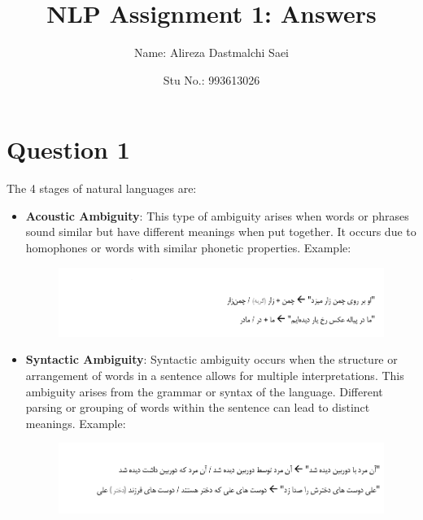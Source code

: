 \documentclass{article}
\title{\textbf{\Huge NLP Assignment 1: Answers}}
\author{Name: Alireza Dastmalchi Saei}
\date{Stu No.: 993613026}
\begin{document}
\maketitle

\pagebreak

\section*{Question 1}
The 4 stages of natural languages are:
\begin{itemize}
    \item \textbf{Acoustic Ambiguity}: This type of ambiguity arises when words or phrases sound similar but have different meanings when put together. It occurs due to homophones or words with similar phonetic properties. Example:

        \begin{figure}[h]
          \centering
          \includegraphics[width=1\textwidth]{Images/Acoustic.png}
          \label{fig:model_diagram}
        \end{figure}

    \item \textbf{Syntactic Ambiguity}: Syntactic ambiguity occurs when the structure or arrangement of words in a sentence allows for multiple interpretations. This ambiguity arises from the grammar or syntax of the language. Different parsing or grouping of words within the sentence can lead to distinct meanings. Example:
        \begin{figure}[h]
          \centering
          \includegraphics[width=1\textwidth]{Images/Syntactic.png}
          \label{fig:model_diagram}
        \end{figure}


\end{itemize}
\end{document}
